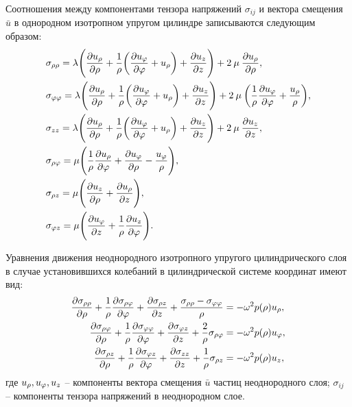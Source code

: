 Соотношения между компонентами тензора напряжений $\sigma_{ij}$ и вектора смещения $\bar{u}$ в однородном изотропном упругом цилиндре записываются следующим образом:
\begin{equation}
\begin{aligned}
&\sigma_{\rho\rho}=\lambda\Biggl(\frac{\partial u_{\rho}}{\partial \rho}+\frac{1}{\rho}\biggl(\frac{\partial u_\varphi}{\partial\varphi}+u_{\rho}\biggr)+\frac{\partial u_z}{\partial z}\Biggr)+2\:\mu\:\frac{\partial u_{\rho}}{\partial \rho},\\
&\sigma_{\varphi\varphi}=\lambda\Biggl(\frac{\partial u_{\rho}}{\partial \rho}+\frac{1}{\rho}\biggl(\frac{\partial u_\varphi}{\partial\varphi}+u_{\rho}\biggr)+\frac{\partial u_z}{\partial z}\Biggr)+2\:\mu\:\biggl(\frac{1}{\rho}\frac{\partial u_\varphi}{\partial\varphi}+\frac{u_{\rho}}{\rho}\biggr),\\
&\sigma_{zz}=\lambda\Biggl(\frac{\partial u_{\rho}}{\partial \rho}+\frac{1}{\rho}\biggl(\frac{\partial u_\varphi}{\partial\varphi}+u_{\rho}\biggr)+\frac{\partial u_z}{\partial z}\Biggr)+2\:\mu\:\frac{\partial u_z}{\partial z},\\
&\sigma_{\rho\varphi}=\mu\Biggl(\frac{1}{\rho}\frac{\partial u_{\rho}}{\partial\varphi}+\frac{\partial u_\varphi}{\partial \rho}-\frac{u_{\varphi}}{\rho}\Biggr),\\
&\sigma_{\rho z}=\mu\Biggl(\frac{\partial u_z}{\partial \rho}+\frac{\partial u_{\rho}}{\partial z}\Biggr),\\
&\sigma_{\varphi z}=\mu\Biggl(\frac{\partial u_\varphi}{\partial z}+\frac{1}{\rho}\frac{\partial u_z}{\partial \varphi}\Biggr).
\end{aligned}
\end{equation}

Уравнения движения неоднородного изотропного упругого цилиндрического слоя в случае установившихся колебаний в цилиндрической системе координат имеют вид:
\begin{equation}
\begin{aligned}
\frac{\partial\sigma_{\rho\rho}}{
\partial \rho}+\frac{1}{\rho}\frac{\partial\sigma_{\rho\varphi}}{\partial\varphi}+\frac{\partial\sigma_{\rho z}}{\partial z}+\frac{\sigma_{\rho\rho}-\sigma_{\varphi\varphi}}{\rho}&=-\omega^2 p(\rho)u_{\rho},\\
\frac{\partial\sigma_{\rho\varphi}}{
\partial \rho}+\frac{1}{\rho}\frac{\partial\sigma_{\varphi\varphi}}{\partial\varphi}+\frac{\partial\sigma_{\varphi z}}{\partial z}+\frac{2}{\rho}\sigma_{\rho\varphi}&=-\omega^2 p(\rho)u_{\varphi},\\
\frac{\partial\sigma_{\rho z}}{
\partial \rho}+\frac{1}{\rho}\frac{\partial\sigma_{\varphi z}}{\partial\varphi}+\frac{\partial\sigma_{zz}}{\partial z}+\frac{1}{\rho}\sigma_{\rho z}&=-\omega^2 p(\rho)u_z,
\end{aligned}
\end{equation}
где $u_{\rho}, u_{\varphi}, u_z$ -- компоненты вектора смещения $\bar{u}$ частиц неоднородного слоя; $\sigma_{ij}$ -- компоненты тензора напряжений в неоднородном слое.

